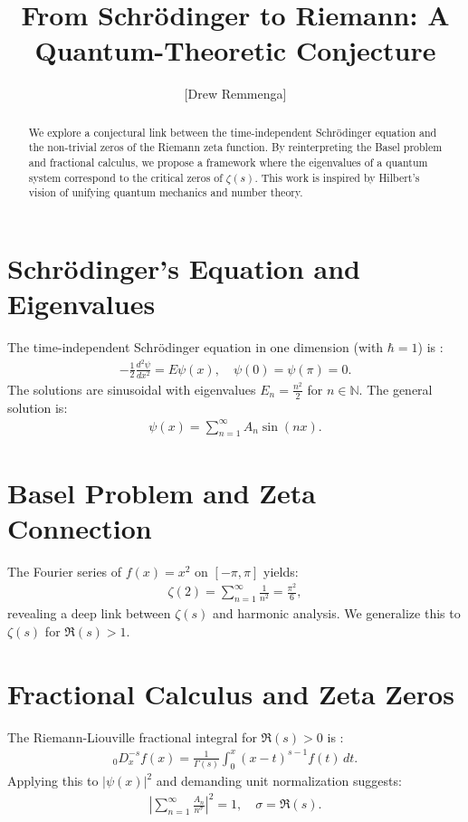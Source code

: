 \documentclass[10pt, oneside]{article}
\title{From Schrödinger to Riemann: A Quantum-Theoretic Conjecture}
\author{[Drew Remmenga]}
\newcommand{\N}{\mathbb{N}}
\begin{document}
\maketitle

\begin{abstract}
  We explore a conjectural link between the time-independent Schrödinger equation and the non-trivial zeros of the Riemann zeta function. By reinterpreting the Basel problem and fractional calculus, we propose a framework where the eigenvalues of a quantum system correspond to the critical zeros of $\zeta(s)$. This work is inspired by Hilbert's vision of unifying quantum mechanics and number theory.
\end{abstract}

\section{Schrödinger's Equation and Eigenvalues}
The time-independent Schrödinger equation in one dimension (with $\hbar = 1$) is \cite{Islam1994}:
\begin{align}
  -\frac{1}{2} \frac{d^2 \psi}{dx^2} = E \psi(x), \quad \psi(0) = \psi(\pi) = 0. \label{schrodinger}
\end{align}
The solutions are sinusoidal with eigenvalues $E_n = \frac{n^2}{2}$ for $n \in \N$. The general solution is:
\begin{align}
  \psi(x) = \sum_{n=1}^\infty A_n \sin(nx). \label{eq:wave}
\end{align}

\section{Basel Problem and Zeta Connection}
The Fourier series of $f(x) = x^2$ on $[-\pi, \pi]$ yields:
\begin{align}
  \zeta(2) = \sum_{n=1}^\infty \frac{1}{n^2} = \frac{\pi^2}{6}, \label{eq:basel}
\end{align}
revealing a deep link between $\zeta(s)$ and harmonic analysis. We generalize this to $\zeta(s)$ for $\Re(s) > 1$.

\section{Fractional Calculus and Zeta Zeros}
The Riemann-Liouville fractional integral for $\Re(s) > 0$ is \cite{Hadamard1892} \cite{Hermann2014}:
\begin{align}
  _0D_x^{-s} f(x) = \frac{1}{\Gamma(s)} \int_0^x (x-t)^{s-1} f(t) \, dt. \label{Riemann-Liouville}
\end{align}
Applying this to $|\psi(x)|^2$ and demanding unit normalization suggests:
\begin{align}
  |\sum_{n=1}^\infty \frac{A_n}{n^{\sigma}}|^2 = 1, \quad \sigma = \Re(s). \label{eq:norm}
\end{align}
\end{document}
